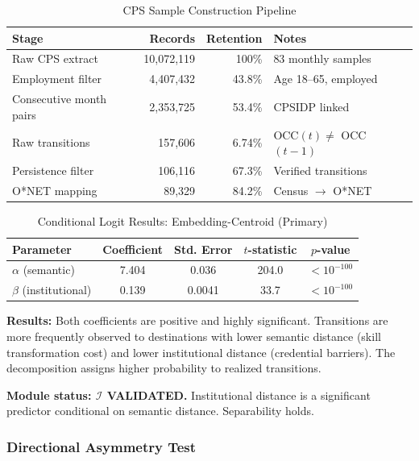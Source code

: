 \documentclass[12pt]{article}
\begin{document}
\begin{table}[h!]
\centering
\caption{CPS Sample Construction Pipeline}
\label{tab:cps-pipeline}
\begin{tabular}{lrrp{5cm}}
\toprule
\textbf{Stage} & \textbf{Records} & \textbf{Retention} & \textbf{Notes} \\
\midrule
Raw CPS extract & 10,072,119 & 100\% & 83 monthly samples \\
Employment filter & 4,407,432 & 43.8\% & Age 18--65, employed \\
Consecutive month pairs & 2,353,725 & 53.4\% & CPSIDP linked \\
Raw transitions & 157,606 & 6.74\% & OCC$(t) \neq$ OCC$(t-1)$ \\
Persistence filter & 106,116 & 67.3\% & Verified transitions \\
O*NET mapping & 89,329 & 84.2\% & Census $\to$ O*NET \\
\bottomrule
\end{tabular}
\end{table}


\begin{table}[h!]
\centering
\caption{Conditional Logit Results: Embedding-Centroid (Primary)}
\label{tab:clogit-primary}
\begin{tabular}{lcccc}
\toprule
\textbf{Parameter} & \textbf{Coefficient} & \textbf{Std. Error} & \textbf{$t$-statistic} & \textbf{$p$-value} \\
\midrule
$\alpha$ (semantic) & 7.404 & 0.036 & 204.0 & $< 10^{-100}$ \\
$\beta$ (institutional) & 0.139 & 0.0041 & 33.7 & $< 10^{-100}$ \\
\bottomrule
\end{tabular}
\end{table}


\textbf{Results:} Both coefficients are positive and highly significant. Transitions are more frequently observed to destinations with lower semantic distance (skill transformation cost) and lower institutional distance (credential barriers). The decomposition assigns higher probability to realized transitions.

\textbf{Module status: $\mathcal{I}$ VALIDATED.} Institutional distance is a significant predictor conditional on semantic distance. Separability holds.


\subsubsection{Directional Asymmetry Test}
\label{subsubsec:asymmetric-test}
\end{document}
